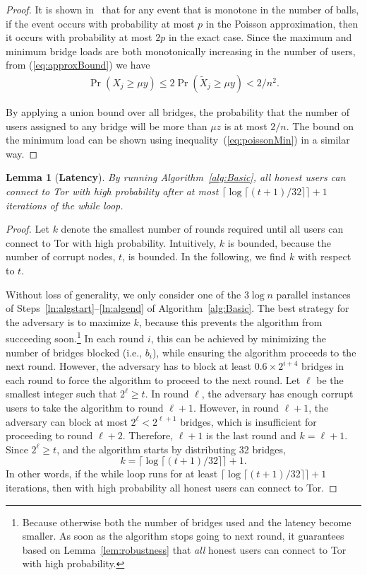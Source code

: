\documentclass[letterpaper,twocolumn,10pt]{article}
\newcommand{\ie}{i.e.}
\newtheorem{lemma}{Lemma}
\newcommand{\sfsize}{\fontsize{0.73\baselineskip}{0.73\baselineskip}\selectfont}
\newcommand{\sans}[1]{\textsf{\sfsize \mbox{#1}}}
\newcommand{\sansb}[1]{\textbf{\sans{\mbox{#1}}}}
\begin{document}
\begin{proof}
	It is shown in~\cite[Corollary 5.11]{Michael2005} that for any event that is monotone in the number of balls, if the event occurs with probability at most $p$ in the Poisson approximation, then it occurs with probability at most $2p$ in the exact case. Since the maximum and minimum bridge loads are both monotonically increasing in the number of users, from (\ref{eq:approxBound}) we have
	\begin{align*}
	\Pr(X_j \geq \mu y) \leq 2\Pr(\tilde{X}_j \geq \mu y) < 2/n^2.
	\end{align*}
	
	By applying a union bound over all bridges, the probability that the number of users assigned to any bridge will be more than $\mu z$ is at most $2/n$. The bound on the minimum load can be shown using inequality~(\ref{eq:poissonMin}) in a similar way.
\end{proof}

\begin{lemma}[\sansb{Latency}] \label{lem:NumIterationsBasic}
	By running Algorithm~\ref{alg:Basic}, all honest users can connect to Tor with high probability after at most ${\lceil \log{\lceil (t+1)/32 \rceil} \rceil + 1}$ iterations of the while loop.
\end{lemma}
\begin{proof}
	Let $k$ denote the smallest number of rounds required until all users can connect to Tor with high probability. Intuitively, $k$ is  bounded, because the number of corrupt nodes, $t$, is bounded. In the following, we find $k$ with respect to $t$. 
	
	Without loss of generality, we only consider one of the $3\log{n}$ parallel instances of Steps~\ref{ln:algstart}--\ref{ln:algend} of Algorithm~\ref{alg:Basic}. The best strategy for the adversary is to maximize $k$, because this prevents the algorithm from succeeding soon.\footnote{Because otherwise both the number of bridges used and the latency become smaller. As soon as the algorithm stops going to next round, it guarantees based on Lemma~\ref{lem:robustness} that \emph{all} honest users can connect to Tor with high probability.} In each round $i$, this can be achieved by minimizing the number of bridges blocked (\ie, $b_i$), while ensuring the algorithm proceeds to the next round. However, the adversary has to block at least ${0.6 \times 2^{i+4}}$ bridges in each round to force the algorithm to proceed to the next round. Let $\ell$ be the smallest integer such that ${2^\ell \geq t}$. In round $\ell$, the adversary has enough corrupt users to take the algorithm to round ${\ell + 1}$. However, in round ${{\ell + 1}}$, the adversary can block at most ${2^\ell < 2^{\ell+1}}$ bridges, which is insufficient for proceeding to round ${\ell + 2}$. Therefore, ${\ell + 1}$ is the last round and ${k = \ell + 1}$. Since ${2^\ell \geq t}$, and the algorithm starts by distributing 32 bridges, 
	\[k = \lceil \log{\lceil (t+1)/32 \rceil} \rceil + 1.\] 
	In other words, if the while loop runs for at least ${\lceil \log{\lceil (t+1)/32 \rceil} \rceil + 1}$ iterations, then with high probability all honest users can connect to Tor.
\end{proof}
\end{document}
